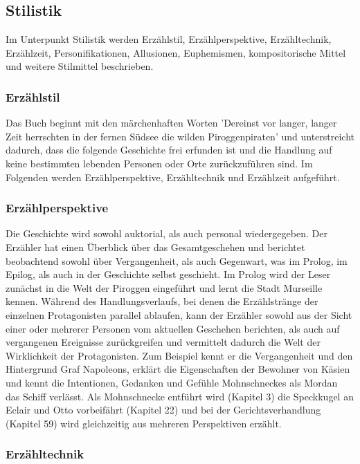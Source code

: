 \subsection{Stilistik}
Im Unterpunkt Stilistik werden Erzählstil, Erzählperspektive, Erzähltechnik, Erzählzeit, Personifikationen, Allusionen, Euphemismen, kompositorische Mittel und weitere Stilmittel beschrieben.

\subsubsection{Erzählstil}


Das Buch beginnt mit den märchenhaften Worten 'Dereinst vor langer, langer Zeit herrschten in der fernen Südsee die wilden Piroggenpiraten'\cite[S.7]{pir} und unterstreicht dadurch, dass die folgende Geschichte frei erfunden ist und die Handlung auf keine bestimmten lebenden Personen oder Orte zurückzuführen sind. 
Im Folgenden werden Erzählperspektive, Erzähltechnik und Erzählzeit aufgeführt.

\subsubsection{Erzählperspektive}

Die Geschichte wird sowohl auktorial, als auch personal wiedergegeben. Der Erzähler hat einen Überblick über das Gesamtgeschehen und berichtet  beobachtend sowohl über Vergangenheit, als auch Gegenwart, was im Prolog, im Epilog, als auch in der Geschichte selbst geschieht. 
Im Prolog wird der Leser zunächst in die Welt der Piroggen eingeführt und lernt die Stadt Murseille kennen. Während des Handlungsverlaufs, bei denen die Erzählstränge der einzelnen Protagonisten parallel ablaufen, kann der Erzähler sowohl aus der Sicht einer oder mehrerer Personen vom aktuellen Geschehen berichten, als auch auf vergangenen Ereignisse zurückgreifen und vermittelt dadurch die Welt der Wirklichkeit der Protagonisten. Zum Beispiel kennt er die Vergangenheit und den Hintergrund Graf Napoleons, \cite[S.17f]{pir} erklärt die Eigenschaften der Bewohner von Käsien \cite[S.140f]{pir} und kennt die Intentionen, Gedanken und Gefühle Mohnschneckes als Mordan das Schiff verlässt.\cite[S.374]{pir} Als Mohnschnecke entführt wird (Kapitel 3) die Speckkugel an Eclair und Otto vorbeifährt (Kapitel 22) und bei der Gerichtsverhandlung (Kapitel 59) wird gleichzeitig aus mehreren Perspektiven erzählt.



\subsubsection{Erzähltechnik}

